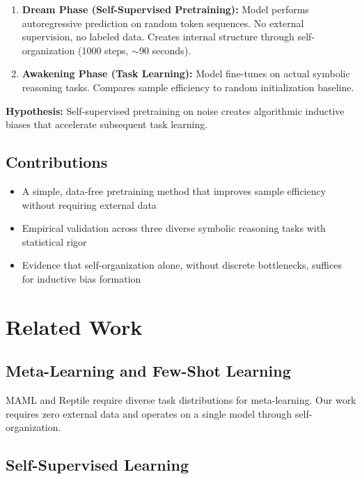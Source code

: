 \documentclass[11pt,twocolumn]{article}
\begin{document}
\begin{enumerate}
    \item \textbf{Dream Phase (Self-Supervised Pretraining):}
    Model performs autoregressive prediction on random token sequences. No external supervision, no labeled data. Creates internal structure through self-organization (1000 steps, $\sim$90 seconds).

    \item \textbf{Awakening Phase (Task Learning):}
    Model fine-tunes on actual symbolic reasoning tasks. Compares sample efficiency to random initialization baseline.
\end{enumerate}

\textbf{Hypothesis:} Self-supervised pretraining on noise creates algorithmic inductive biases that accelerate subsequent task learning.

\subsection{Contributions}

\begin{itemize}
    \item A simple, data-free pretraining method that improves sample efficiency without requiring external data
    \item Empirical validation across three diverse symbolic reasoning tasks with statistical rigor
    \item Evidence that self-organization alone, without discrete bottlenecks, suffices for inductive bias formation
\end{itemize}

\section{Related Work}

\subsection{Meta-Learning and Few-Shot Learning}

MAML \cite{finn2017maml} and Reptile \cite{nichol2018reptile} require diverse task distributions for meta-learning. Our work requires zero external data and operates on a single model through self-organization.

\subsection{Self-Supervised Learning}
\end{document}
